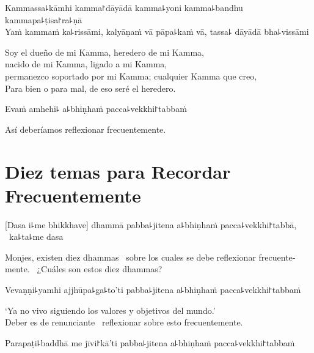 \clearpage

%
Kammassa꜕kāmhi kamma꜓dāyādā kamma꜕yoni kamma꜕bandhu kammapa꜕ṭisa꜓ra꜕ṇā\\
Yaṁ kammaṁ ka꜕rissāmi, kalyāṇaṁ vā pāpa꜕kaṁ vā, tassa꜕ dāyādā bha꜕vissāmi

\begin{english}
  Soy el dueño de mi Kamma, heredero de mi Kamma, \\
  nacido de mi Kamma, ligado a mi Kamma,\\
  permanezco soportado por mi Kamma; cualquier Kamma que creo, \\
  Para bien o para mal, de eso seré el heredero.
\end{english}

Evaṁ amhehi꜕ a꜕bhiṇhaṁ pacca꜕vekkhi꜓tabbaṁ

\begin{english}
  Así deberíamos reflexionar frecuentemente.
\end{english}

\chapter[Diez temas]{Diez temas para Recordar Frecuentemente}


\begin{leader}
\end{leader}

[Dasa i꜕me bhikkhave] dhammā pabba꜕jitena a꜕bhiṇhaṁ pacca꜕vekkhi꜓tabbā, \pause\ ka꜕ta꜕me dasa

\begin{english}
  Monjes, existen diez dhammas \pause\ sobre los cuales se debe reflexionar frecuentemente. \pause\ ¿Cuáles son estos diez dhammas?
\end{english}

Vevaṇṇi꜕yamhi ajjhūpa꜕ga꜕to'ti pabba꜕jitena a꜕bhiṇhaṁ pacca꜕vekkhi꜓tabbaṁ

\begin{english}
  `Ya no vivo siguiendo los valores y objetivos del mundo.' \pause\\
  Deber es de renunciante \pause\ reflexionar sobre esto frecuentemente.
\end{english}

Parapaṭi꜕baddhā me jīvi꜓kā'ti pabba꜕jitena a꜕bhiṇhaṁ pacca꜕vekkhi꜓tabbaṁ

